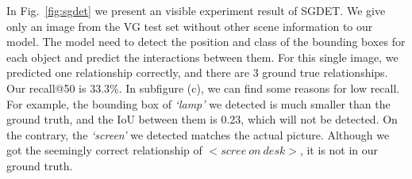 In Fig.~\ref{fig:sgdet}  we present an visible experiment result of SGDET. We give only an image from the VG test set without other scene information to our model. The model need to detect the position and class of the bounding boxes for each object and predict the interactions between them. For this single image, we predicted one relationship correctly, and there are 3 ground true relationships. Our recall@50 is 33.3\%.  In subfigure (c), we can find some reasons for low recall. For example, the bounding box of \textit{`lamp' }we detected is much smaller than the ground truth, and the IoU between them is 0.23, which will not be detected. On the contrary, the \textit{`screen' }we detected matches the actual picture. Although we got the seemingly correct relationship of $ <scree\ on \ desk> $, it is not in our ground truth.

